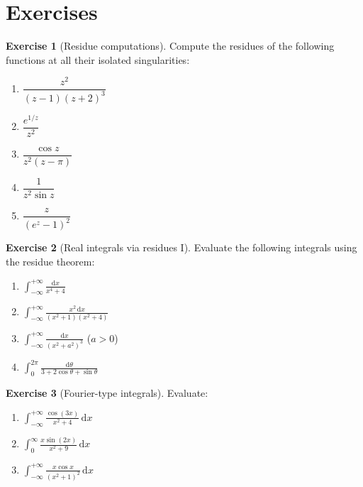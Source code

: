\documentclass[12pt,a4paper,openany]{book}
\theoremstyle{definition}
\newtheorem{exercise}{Exercise}[chapter]
\theoremstyle{plain}
\theoremstyle{remark}
\newcommand{\dd}{\mathrm{d}}
\begin{document}
\section{Exercises}\label{sec:ex-ch7}

\begin{exercise}[Residue computations]\label{exer:res-compute}
Compute the residues of the following functions at all their isolated
singularities:
\begin{enumerate}[label=(\alph*)]
  \item $\dfrac{z^2}{(z-1)(z+2)^3}$
  \item $\dfrac{e^{1/z}}{z^2}$
  \item $\dfrac{\cos z}{z^2(z-\pi)}$
  \item $\dfrac{1}{z^2\sin z}$
  \item $\dfrac{z}{(e^z-1)^2}$
\end{enumerate}
\end{exercise}

\begin{exercise}[Real integrals via residues I]\label{exer:real-int-1}
Evaluate the following integrals using the residue theorem:
\begin{enumerate}[label=(\alph*)]
  \item $\displaystyle\int_{-\infty}^{+\infty}\frac{\dd x}{x^4+4}$
  \item $\displaystyle\int_{-\infty}^{+\infty}
        \frac{x^2\,\dd x}{(x^2+1)(x^2+4)}$
  \item $\displaystyle\int_{-\infty}^{+\infty}
        \frac{\dd x}{(x^2+a^2)^3}$ \quad ($a>0$)
  \item $\displaystyle\int_0^{2\pi}
        \frac{\dd\theta}{3+2\cos\theta+\sin\theta}$
\end{enumerate}
\end{exercise}

\begin{exercise}[Fourier-type integrals]\label{exer:fourier}
Evaluate:
\begin{enumerate}[label=(\alph*)]
  \item $\displaystyle\int_{-\infty}^{+\infty}
        \frac{\cos(3x)}{x^2+4}\,\dd x$
  \item $\displaystyle\int_0^{\infty}
        \frac{x\sin(2x)}{x^2+9}\,\dd x$
  \item $\displaystyle\int_{-\infty}^{+\infty}
        \frac{x\cos x}{(x^2+1)^2}\,\dd x$
\end{enumerate}
\end{exercise}
\end{document}
